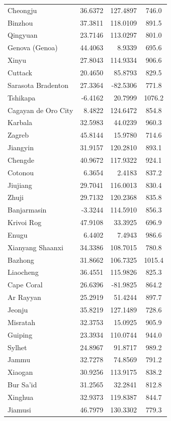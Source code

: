 \begin{longtable}{lrrc}
Cheongju & 36.6372 & 127.4897 & 746.0 \\
Binzhou & 37.3811 & 118.0109 & 891.5 \\
Qingyuan & 23.7146 & 113.0297 & 801.0 \\
Genova (Genoa) & 44.4063 & 8.9339 & 695.6 \\
Xinyu & 27.8043 & 114.9334 & 906.6 \\
Cuttack & 20.4650 & 85.8793 & 829.5 \\
Sarasota Bradenton & 27.3364 & -82.5306 & 771.8 \\
Tshikapa & -6.4162 & 20.7999 & 1076.2 \\
Cagayan de Oro City & 8.4822 & 124.6472 & 854.8 \\
Karbala & 32.5983 & 44.0239 & 960.3 \\
Zagreb & 45.8144 & 15.9780 & 714.6 \\
Jiangyin & 31.9157 & 120.2810 & 893.1 \\
Chengde & 40.9672 & 117.9322 & 924.1 \\
Cotonou & 6.3654 & 2.4183 & 837.2 \\
Jiujiang & 29.7041 & 116.0013 & 830.4 \\
Zhuji & 29.7132 & 120.2368 & 835.8 \\
Banjarmasin & -3.3244 & 114.5910 & 856.3 \\
Krivoi Rog & 47.9108 & 33.3925 & 696.9 \\
Enugu & 6.4402 & 7.4943 & 986.6 \\
Xianyang  Shaanxi & 34.3386 & 108.7015 & 780.8 \\
Bazhong & 31.8662 & 106.7325 & 1015.4 \\
Liaocheng & 36.4551 & 115.9826 & 825.3 \\
Cape Coral & 26.6396 & -81.9825 & 864.2 \\
Ar Rayyan & 25.2919 & 51.4244 & 897.7 \\
Jeonju & 35.8219 & 127.1489 & 728.6 \\
Misratah & 32.3753 & 15.0925 & 905.9 \\
Guiping & 23.3934 & 110.0744 & 944.0 \\
Sylhet & 24.8967 & 91.8717 & 989.2 \\
Jammu & 32.7278 & 74.8569 & 791.2 \\
Xiaogan & 30.9256 & 113.9175 & 838.2 \\
Bur Sa'id & 31.2565 & 32.2841 & 812.8 \\
Xinghua & 32.9373 & 119.8387 & 844.7 \\
Jiamusi & 46.7979 & 130.3302 & 779.3 \\

\end{longtable}
